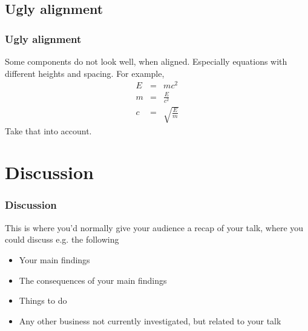 \documentclass[aspectratio=169]{beamer}
\begin{document}
\subsection{Ugly alignment}
\begin{frame}
\frametitle{Ugly alignment}
Some components do not look well, when aligned. Especially equations with different heights and spacing. For example, 
\begin{eqnarray}
    E &=& mc^2 \\
    m &=& \frac{E}{c^2}\\
    c &=& \sqrt{\frac{E}{m}} 
\end{eqnarray}   
Take that into account.
\end{frame}

\section{Discussion}
\begin{frame}
\frametitle{Discussion}
This is where you’d normally give your audience a recap of your talk, where you could discuss e.g. the following
\begin{itemize}
\item Your main findings
\item The consequences of your main findings
\item Things to do
\item Any other business not currently investigated, but related to your talk
\end{itemize}
\end{frame}
\end{document}

